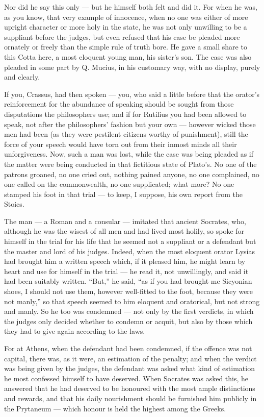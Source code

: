  Nor did he say this only — but he himself both felt and did it. For when he was, as you know, that very example of innocence, when no one was either of more upright character or more holy in the state, he was not only unwilling to be a suppliant before the judges, but even refused that his case be pleaded more ornately or freely than the simple rule of truth bore. He gave a small share to this Cotta here, a most eloquent young man, his sister's son. The case was also pleaded in some part by Q. Mucius, in his customary way, with no display, purely and clearly.

 If you, Crassus, had then spoken — you, who said a little before that the orator's reinforcement for the abundance of speaking should be sought from those disputations the philosophers use; and if for Rutilius you had been allowed to speak, not after the philosophers' fashion but your own — however wicked those men had been (as they were pestilent citizens worthy of punishment), still the force of your speech would have torn out from their inmost minds all their unforgiveness. Now, such a man was lost, while the case was being pleaded as if the matter were being conducted in that fictitious state of Plato's. No one of the patrons groaned, no one cried out, nothing pained anyone, no one complained, no one called on the commonwealth, no one supplicated; what more? No one stamped his foot in that trial — to keep, I suppose, his own report from the Stoics.

 The man — a Roman and a consular — imitated that ancient Socrates, who, although he was the wisest of all men and had lived most holily, so spoke for himself in the trial for his life that he seemed not a suppliant or a defendant but the master and lord of his judges. Indeed, when the most eloquent orator Lysias had brought him a written speech which, if it pleased him, he might learn by heart and use for himself in the trial — he read it, not unwillingly, and said it had been suitably written. ``But,'' he said, ``as if you had brought me Sicyonian shoes, I should not use them, however well-fitted to the foot, because they were not manly,'' so that speech seemed to him eloquent and oratorical, but not strong and manly. So he too was condemned — not only by the first verdicts, in which the judges only decided whether to condemn or acquit, but also by those which they had to give again according to the laws.

 For at Athens, when the defendant had been condemned, if the offence was not capital, there was, as it were, an estimation of the penalty; and when the verdict was being given by the judges, the defendant was asked what kind of estimation he most confessed himself to have deserved. When Socrates was asked this, he answered that he had deserved to be honoured with the most ample distinctions and rewards, and that his daily nourishment should be furnished him publicly in the Prytaneum — which honour is held the highest among the Greeks.

